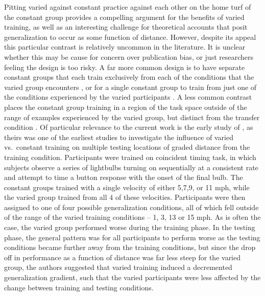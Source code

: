 \documentclass[
  12pt,
  letterpaper,
]{article}
\begin{document}
Pitting varied against constant practice against each other on the home
turf of the constant group provides a compelling argument for the
benefits of varied training, as well as an interesting challenge for
theoretical accounts that posit generalization to occur as some function
of distance. However, despite its appeal this particular contrast is
relatively uncommon in the literature. It is unclear whether this may be
cause for concern over publication bias, or just researchers feeling the
design is too risky. A far more common design is to have separate
constant groups that each train exclusively from each of the conditions
that the varied group encounters
\autocite{catalanoDistantTransferCoincident1984a,chuaPracticeVariabilityPromotes2019,newellVariabilityPracticeTransfer1976,moxleySchemaVariabilityPractice1979,mccrackenTestSchemaTheory1977},
or for a single constant group to train from just one of the conditions
experienced by the varied participants
\autocite{pigottMotorSchemaStructure1984,rollerVariablePracticeLenses2001,wrisbergTrainingProductionNovel1984,wrisbergDevelopingCoincidentTiming1983}.
A less common contrast places the constant group training in a region of
the task space outside of the range of examples experienced by the
varied group, but distinct from the transfer condition
\autocite{wrisbergVariabilityPracticeHypothesis1987,wulfVariabilityPracticeImplicit1997}.
Of particular relevance to the current work is the early study of
\textcite{catalanoDistantTransferCoincident1984a}, as theirs was one of
the earliest studies to investigate the influence of varied vs.~constant
training on multiple testing locations of graded distance from the
training condition. Participants were trained on coincident timing task,
in which subjects observe a series of lightbulbs turning on sequentially
at a consistent rate and attempt to time a button response with the
onset of the final bulb. The constant groups trained with a single
velocity of either 5,7,9, or 11 mph, while the varied group trained from
all 4 of these velocities. Participants were then assigned to one of
four possible generalization conditions, all of which fell outside of
the range of the varied training conditions -- 1, 3, 13 or 15 mph. As is
often the case, the varied group performed worse during the training
phase. In the testing phase, the general pattern was for all
participants to perform worse as the testing conditions became further
away from the training conditions, but since the drop off in performance
as a function of distance was far less steep for the varied group, the
authors suggested that varied training induced a decremented
generalization gradient, such that the varied participants were less
affected by the change between training and testing conditions.
\end{document}
